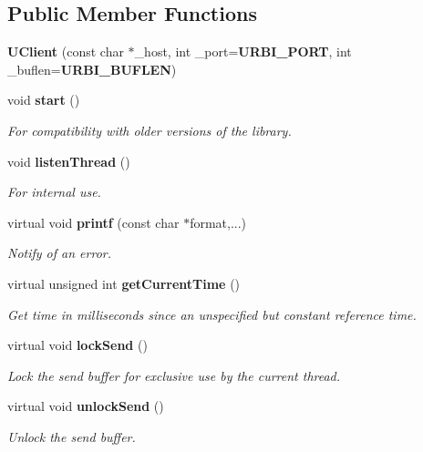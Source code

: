\subsection*{Public Member Functions}
\begin{CompactItemize}
\item 
{\bf UClient} (const char $\ast$\_\-host, int \_\-port={\bf URBI\_\-PORT}, int \_\-buflen={\bf URBI\_\-BUFLEN})
\item 
void {\bf start} ()\label{classUClient_a2}

\begin{CompactList}\small\item\em For compatibility with older versions of the library. \item\end{CompactList}\item 
void {\bf listen\-Thread} ()\label{classUClient_a3}

\begin{CompactList}\small\item\em For internal use. \item\end{CompactList}\item 
virtual void {\bf printf} (const char $\ast$format,...)\label{classUClient_a4}

\begin{CompactList}\small\item\em Notify of an error. \item\end{CompactList}\item 
virtual unsigned int {\bf get\-Current\-Time} ()\label{classUClient_a5}

\begin{CompactList}\small\item\em Get time in milliseconds since an unspecified but constant reference time. \item\end{CompactList}\item 
virtual void {\bf lock\-Send} ()\label{classUClient_a6}

\begin{CompactList}\small\item\em Lock the send buffer for exclusive use by the current thread. \item\end{CompactList}\item 
virtual void {\bf unlock\-Send} ()\label{classUClient_a7}

\begin{CompactList}\small\item\em Unlock the send buffer. \item\end{CompactList}\end{CompactItemize}

